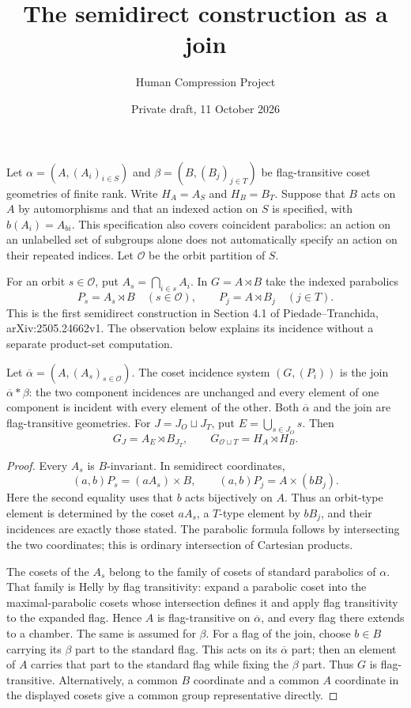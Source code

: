 
\title{The semidirect construction as a join}
\author{Human Compression Project}\date{Private draft, 11 October 2026}
\maketitle
Let $\alpha=(A,(A_i)_{i\in S})$ and
$\beta=(B,(B_j)_{j\in T})$ be flag-transitive coset geometries of
finite rank. Write $H_A=A_S$ and $H_B=B_T$. Suppose that $B$ acts on
$A$ by automorphisms and that an indexed action on $S$ is specified,
with $b(A_i)=A_{bi}$. This specification also covers coincident
parabolics: an action on an unlabelled set of subgroups alone does not
automatically specify an action on their repeated indices. Let
$\mathcal O$ be the orbit partition of $S$.

For an orbit $s\in\mathcal O$, put $A_s=\bigcap_{i\in s}A_i$.
In $G=A\rtimes B$ take the indexed parabolics
\[
 P_s=A_s\rtimes B\quad(s\in\mathcal O),\qquad
 P_j=A\rtimes B_j\quad(j\in T).
\]
This is the first semidirect construction in Section 4.1 of
Piedade--Tranchida, arXiv:2505.24662v1. The observation below explains
its incidence without a separate product-set computation.

\begin{proposition}\label{prop:join}
Let $\overline\alpha=(A,(A_s)_{s\in\mathcal O})$. The coset
incidence system $(G,(P_i))$ is the join
$\overline\alpha*\beta$: the two component incidences are unchanged
and every element of one component is incident with every element of
the other. Both $\overline\alpha$ and the join are flag-transitive
geometries. For $J=J_O\sqcup J_T$, put
$E=\bigcup_{s\in J_O}s$. Then
\[
 G_J=A_E\rtimes B_{J_T},\qquad G_{\mathcal O\sqcup T}=H_A\rtimes H_B.
\]
\end{proposition}
\begin{proof}
Every $A_s$ is $B$-invariant. In semidirect coordinates,
\[
 (a,b)P_s=(aA_s)\times B,\qquad
 (a,b)P_j=A\times(bB_j).
\]
Here the second equality uses that $b$ acts bijectively on $A$.
Thus an orbit-type element is determined by the coset $aA_s$, a
$T$-type element by $bB_j$, and their incidences are exactly those
stated. The parabolic formula follows by intersecting the two
coordinates; this is ordinary intersection of Cartesian products.

The cosets of the $A_s$ belong to the family of cosets of standard
parabolics of $\alpha$. That family is Helly by flag transitivity:
expand a parabolic coset into the maximal-parabolic cosets whose
intersection defines it and apply flag transitivity to the expanded
flag. Hence $A$ is flag-transitive on $\overline\alpha$, and every
flag there extends to a chamber. The same is assumed for $\beta$.
For a flag of the join, choose $b\in B$ carrying its $\beta$ part
to the standard flag. This acts on its $\overline\alpha$ part;
then an element of $A$ carries that part to the standard flag while
fixing the $\beta$ part. Thus $G$ is flag-transitive. Alternatively,
a common $B$ coordinate and a common $A$ coordinate in the displayed
cosets give a common group representative directly.
\end{proof}

